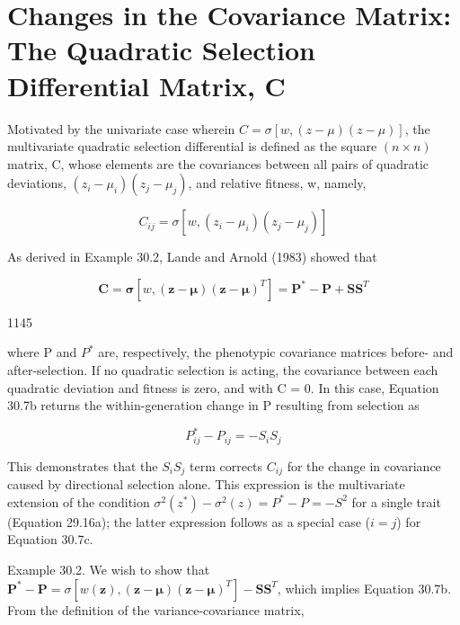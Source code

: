 \documentclass{article}
\begin{document}
\section{Changes in the Covariance Matrix: The Quadratic Selection Differential Matrix, C}
Motivated by the univariate case wherein  $ C = \sigma[w, (z - \mu)(z - \mu)] $, the multivariate quadratic selection differential is defined as the square  $ (n \times n) $ matrix, C, whose elements are the covariances between all pairs of quadratic deviations,  $ (z_i - \mu_i)(z_j - \mu_j) $, and relative fitness, w, namely,

\begin{equation}
C_{i j}=\sigma[w,(z_{i}-\mu_{i})(z_{j}-\mu_{j})]
\tag{30.7a}
\label{eq:30_7a}
\end{equation}

As derived in Example 30.2, Lande and Arnold (1983) showed that

\begin{equation}
\mathbf{C}=\boldsymbol{\sigma}[w,(\mathbf{z}-\boldsymbol{\mu})(\mathbf{z}-\boldsymbol{\mu})^{T}]=\mathbf{P}^{*}-\mathbf{P}+\mathbf{S}\mathbf{S}^{T}
\tag{30.7b}
\label{eq:30_7b}
\end{equation}

1145

where P and  $ P^{*} $ are, respectively, the phenotypic covariance matrices before- and after-selection. If no quadratic selection is acting, the covariance between each quadratic deviation and fitness is zero, and with C = 0. In this case, Equation 30.7b returns the within-generation change in P resulting from selection as

\begin{equation}
P_{ij}^{*}-P_{ij}=-S_{i}S_{j}
\tag{30.7c}
\label{eq:30_7c}
\end{equation}

This demonstrates that the $S_i S_j$ term corrects $C_{ij}$ for the change in covariance caused by directional selection alone. This expression is the multivariate extension of the condition $\sigma^2(z^*) - \sigma^2(z) = P^* - P = -S^2$ for a single trait (Equation 29.16a); the latter expression follows as a special case ($i = j$) for Equation 30.7c.

Example 30.2. We wish to show that  $ \mathbf{P}^* - \mathbf{P} = \sigma[w(\mathbf{z}), (\mathbf{z} - \boldsymbol{\mu})(\mathbf{z} - \boldsymbol{\mu})^T] - \mathbf{S} \mathbf{S}^T $, which implies Equation 30.7b. From the definition of the variance-covariance matrix,
\end{document}
